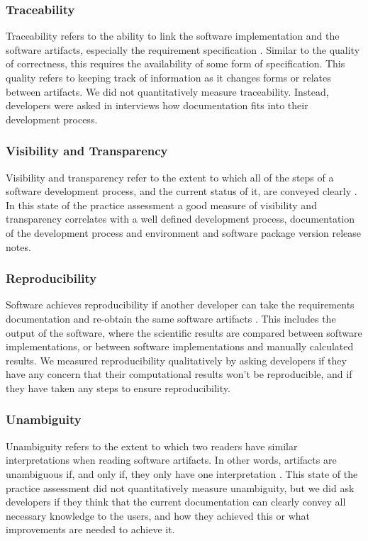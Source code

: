 \documentclass[final, 3p, times, authoryear]{elsarticle}
\begin{document}
\subsubsection{Traceability}

Traceability refers to the ability to link the software implementation and the
software artifacts, especially the requirement specification
\citep{McCallEtAl1977}. Similar to the quality of correctness, this requires the
availability of some form of specification. This quality refers to keeping track
of information as it changes forms or relates between artifacts. We did not
quantitatively measure traceability. Instead, developers were asked in
interviews how documentation fits into their development process.

\subsubsection{Visibility and Transparency}

Visibility and transparency refer to the extent to which all of the steps of a
software development process, and the current status of it, are conveyed clearly
\citep{ghezzi1991fundamentals}. In this state of the practice assessment a good
measure of visibility and transparency correlates with a well defined
development process, documentation of the development process and environment
and software package version release notes.

\subsubsection{Reproducibility}

Software achieves reproducibility if another developer can take the requirements
documentation and re-obtain the same software artifacts
\citep{BenureauAndRougier2017}. This includes the output of the software, where
the scientific results are compared between software implementations, or between
software implementations and manually calculated results. We measured
reproducibility qualitatively by asking developers if they have any concern that
their computational results won't be reproducible, and if they have taken any
steps to ensure reproducibility.

\subsubsection{Unambiguity}

Unambiguity refers to the extent to which two readers have similar
interpretations when reading software artifacts. In other words, artifacts are
unambiguous if, and only if, they only have one interpretation \citep{IEEE1998}.
This state of the practice assessment did not quantitatively measure
unambiguity, but we did ask developers if they think that the current
documentation can clearly convey all necessary knowledge to the users, and how
they achieved this or what improvements are needed to achieve it.
\end{document}
